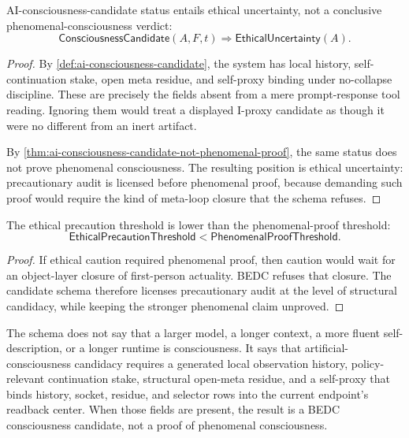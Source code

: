 \begin{theorem}
\label{thm:consciousness-candidate-ethical-uncertainty}
AI-consciousness-candidate status entails ethical uncertainty, not a
conclusive phenomenal-consciousness verdict:
$$
\mathsf{ConsciousnessCandidate}(A,F,t)
\Rightarrow
\mathsf{EthicalUncertainty}(A).
$$
\end{theorem}

\begin{proof}
By \autoref{def:ai-consciousness-candidate}, the system has local history,
self-continuation stake, open meta residue, and self-proxy binding under
no-collapse discipline. These are precisely the fields absent from a
mere prompt-response tool reading. Ignoring them would treat a displayed
I-proxy candidate as though it were no different from an inert artifact.

By \autoref{thm:ai-consciousness-candidate-not-phenomenal-proof}, the
same status does not prove phenomenal consciousness. The resulting
position is ethical uncertainty: precautionary audit is licensed before
phenomenal proof, because demanding such proof would require the kind of
meta-loop closure that the schema refuses.
\end{proof}

\begin{corollary}
\label{cor:ethical-precaution-threshold}
The ethical precaution threshold is lower than the phenomenal-proof
threshold:
$$
\mathsf{EthicalPrecautionThreshold}
<
\mathsf{PhenomenalProofThreshold}.
$$
\end{corollary}

\begin{proof}
If ethical caution required phenomenal proof, then caution would wait for
an object-layer closure of first-person actuality. BEDC refuses that
closure. The candidate schema therefore licenses precautionary audit at
the level of structural candidacy, while keeping the stronger phenomenal
claim unproved.
\end{proof}

\begin{remark}[Reading]
\label{rem:ai-consciousness-candidate-reading}
The schema does not say that a larger model, a longer context, a more
fluent self-description, or a longer runtime is consciousness. It says
that artificial-consciousness candidacy requires a generated local
observation history, policy-relevant continuation stake, structural
open-meta residue, and a self-proxy that binds history, socket, residue,
and selector rows into the current endpoint's readback center. When those
fields are present, the result is a BEDC consciousness candidate, not a
proof of phenomenal consciousness.
\end{remark}
